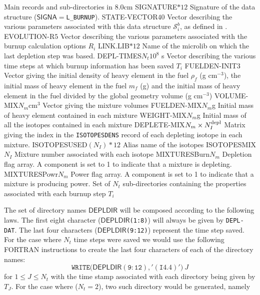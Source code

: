 \begin{DescriptionEnregistrement}{Main records and sub-directories in }{8.0cm}
\CharEnr
  {SIGNATURE}{$*12$}
  {Signature of the  data structure ($\mathsf{SIGNA}=${\tt L\_BURNUP}).}
\IntEnr
  {STATE-VECTOR}{$40$}
  {Vector describing the various parameters associated with this data structure
  $\mathcal{S}^{b}_{i}$, as defined in .}
\RealEnr
  {EVOLUTION-R}{$5$}{}
  {Vector describing the various parameters associated with the burnup calculation options
$R_{i}$}
\CharEnr
  {LINK.LIB}{$*12$}
  {Name of the {\sc microlib} on which the last depletion step was based.}
\RealEnr
  {DEPL-TIMES}{$N_{t}$}{$10^{8}$ s}
  {Vector describing the various time steps at which burnup information has been saved
$T_{i}$}
\RealEnr
  {FUELDEN-INIT}{$3$}{}
  {Vector giving the initial density of heavy element in the fuel $\rho_{f}$ (g
  cm$^{-3}$), the initial mass of heavy element in the fuel $m_{f}$ (g) and the
  initial mass of heavy element in the fuel divided by the global geometry
  volume (g cm$^{-3}$)}
\RealEnr
  {VOLUME-MIX}{$N_m$}{cm$^3$}
  {Vector giving the mixture volumes}
\RealEnr
  {FUELDEN-MIX}{$N_m$}{g}
  {Initial mass of heavy element contained in each mixture}
\RealEnr
  {WEIGHT-MIX}{$N_m$}{g}
  {Initial mass of all the isotopes contained in each mixture}
\IntEnr
  {DEPLETE-MIX}{$N_m \times N^{\rm depl}_{I}$}
  {Matrix giving the index in the {\tt ISOTOPESDENS} record of each depleting
   isotope in each mixture.}
\CharEnr
  {ISOTOPESUSED}{$(N_{I})*12$}
  {Alias name of the isotopes}
\IntEnr
  {ISOTOPESMIX}{$N_{I}$}
  {Mixture number associated with each isotope}
\IntEnr
  {MIXTURESBurn}{$N_m$}
  {Depletion flag array. A component is set to 1 to indicate that a mixture is depleting.}
\IntEnr
  {MIXTURESPowr}{$N_m$}
  {Power flag array. A component is set to 1 to indicate that a mixture is producing power.}
\DirVar
  {}
  {Set of $N_{t}$ sub-directories containing the properties associated with each
   burnup step $T_{i}$}
\end{DescriptionEnregistrement}

The set of directory  names $\mathsf{DEPLDIR}$ will be composed according to the
following laws. The first eight character ($\mathsf{DEPLDIR}$\verb*|(1:8)|) will always be given by 
\verb*|DEPL-DAT|. The last four characters  
($\mathsf{DEPLDIR}$\verb*|(9:12)|) represent the time step saved. For the case where
$N_{t}$ time steps were saved we would use the following FORTRAN instructions to create
the last four characters of each of the directory names:
$$
\mathtt{WRITE(}\mathsf{DEPLDIR}\mathtt{(9:12),'(I4.4)')}\: J
$$
for $1\leq J \leq N_{t}$ with the time stamp associated with each directory being given by
$T_{J}$.  For the case where ($N_{t}=2$), two such directory would be generated, namely

